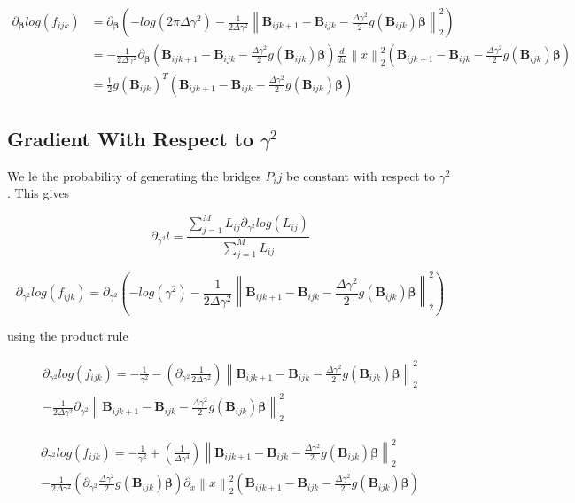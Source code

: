 \begin{equation} 
\begin{split}
\partial_{\bm \beta} log(f_{ijk}) & = \partial_{\bm \beta} (-log(2\pi \Delta \gamma^2) - \frac{1}{2\Delta \gamma^2} \left\lVert \textbf{B}_{ijk+1} - \textbf{B}_{ijk} - \frac{\Delta\gamma^2}{2} g(\textbf{B}_{ijk})\bm \beta \right\rVert_2^2) \\
& = -\frac{1}{2\Delta\gamma^2}\partial_{\bm \beta} (\textbf{B}_{ijk+1} - \textbf{B}_{ijk} - \frac{\Delta\gamma^2}{2} g(\textbf{B}_{ijk})\bm \beta) \frac{d}{dx} \left\lVert x \right\rVert_2^2(\textbf{B}_{ijk+1} - \textbf{B}_{ijk} - \frac{\Delta\gamma^2}{2} g(\textbf{B}_{ijk})\bm \beta) \\
& = \frac{1}{2} g(\textbf{B}_{ijk})^T(\textbf{B}_{ijk+1} - \textbf{B}_{ijk} - \frac{\Delta\gamma^2}{2} g(\textbf{B}_{ijk})\bm \beta)
\end{split}
\end{equation}




\subsection{Gradient With Respect to $\gamma^2$}
We le the probability of generating the bridges $P_ij$ be constant with respect to $\gamma^2$. This gives

$$
\partial_{\gamma^2}l = \frac{\sum_{j=1}^ML_{ij}\partial_{\gamma^2} log(L_{ij})}{\sum_{j=1}^ML_{ij}}
$$


$$
\partial_{\gamma^2} log(f_{ijk}) = \partial_{\gamma^2} (-log(\gamma^2) - \frac{1}{2\Delta\gamma^2}\left\lVert \textbf{B}_{ijk+1} - \textbf{B}_{ijk} - \frac{\Delta\gamma^2}{2} g(\textbf{B}_{ijk})\bm \beta \right\rVert_2^2)
$$

using the product rule

\begin{align*}
\partial_{\gamma^2} log(f_{ijk})  = -\frac{1}{\gamma^2} -(\partial_{\gamma^2} \frac{1}{2\Delta \gamma^2})\left\lVert \textbf{B}_{ijk+1} - \textbf{B}_{ijk} - \frac{\Delta\gamma^2}{2} g(\textbf{B}_{ijk})\bm \beta \right\rVert_2^2 \\ -  \frac{1}{2\Delta \gamma^2} \partial_{\gamma^2} \left\lVert \textbf{B}_{ijk+1} - \textbf{B}_{ijk} - \frac{\Delta\gamma^2}{2} g(\textbf{B}_{ijk})\bm \beta \right\rVert_2^2 
\end{align*}



\begin{align*}
\partial_{\gamma^2} log(f_{ijk})  = -\frac{1}{\gamma^2} +( \frac{1}{\Delta \gamma^4})\left\lVert \textbf{B}_{ijk+1} - \textbf{B}_{ijk} - \frac{\Delta\gamma^2}{2} g(\textbf{B}_{ijk})\bm \beta \right\rVert_2^2 \\ -  \frac{1}{2\Delta \gamma^2} (\partial_{\gamma^2} \frac{\Delta\gamma^2}{2} g(\textbf{B}_{ijk})\bm \beta) \partial_x \left\lVert x\right\rVert_2^2 (\textbf{B}_{ijk+1} - \textbf{B}_{ijk} - \frac{\Delta\gamma^2}{2} g(\textbf{B}_{ijk})\bm \beta )
\end{align*}




